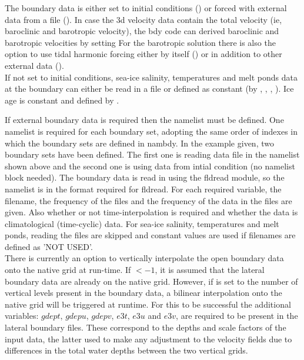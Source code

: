 \documentclass[../main/NEMO_manual]{subfiles}
\begin{document}
The boundary data is either set to initial conditions
() or forced with external data from a file ().
In case the 3d velocity data contain the total velocity (ie, baroclinic and barotropic velocity),
the bdy code can derived baroclinic and barotropic velocities by setting 
For the barotropic solution there is also the option to use tidal harmonic forcing either by
itself () or in addition to other external data ().\\
If not set to initial conditions, sea-ice salinity, temperatures and melt ponds data at the boundary can either be read in a file or defined as constant (by , , , ). Ice age is constant and defined by .

If external boundary data is required then the  namelist must be defined.
One  namelist is required for each boundary set, adopting the same order of indexes in which the boundary sets are defined in nambdy.
In the example given, two boundary sets have been defined. The first one is reading data file in the  namelist shown above
and the second one is using data from intial condition (no namelist block needed).
The boundary data is read in using the fldread module,
so the  namelist is in the format required for fldread.
For each required variable, the filename, the frequency of the files and
the frequency of the data in the files are given.
Also whether or not time-interpolation is required and whether the data is climatological (time-cyclic) data.
For sea-ice salinity, temperatures and melt ponds, reading the files are skipped and constant values are used if filenames are defined as {'NOT USED'}.\\

There is currently an option to vertically interpolate the open boundary data onto the native grid at run-time.
If $<-1$, it is assumed that the lateral boundary data are already on the native grid.
However, if  is set to the number of vertical levels present in the boundary data,
a bilinear interpolation onto the native grid will be triggered at runtime.
For this to be successful the additional variables: $gdept$, $gdepu$, $gdepv$, $e3t$, $e3u$ and $e3v$, are required to be present in the lateral boundary files.
These correspond to the depths and scale factors of the input data,
the latter used to make any adjustment to the velocity fields due to differences in the total water depths between the two vertical grids.\\
\end{document}
